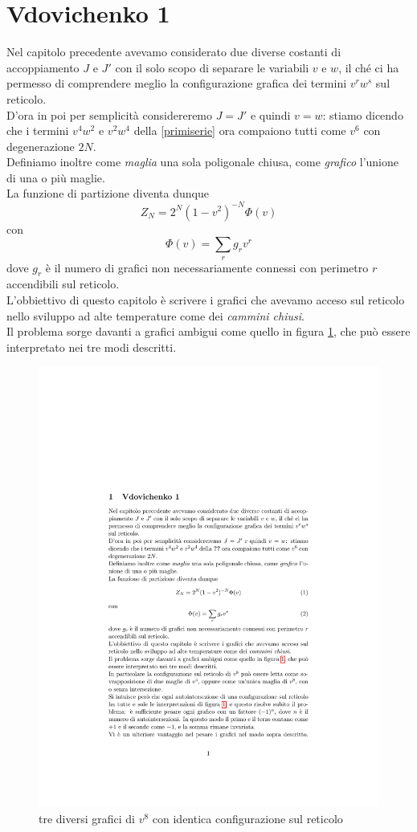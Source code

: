 \documentclass[11pt]{article}
\title{}
\author{}
\date{}
\begin{document}
\maketitle

\section{Vdovichenko 1}
\noindent
Nel capitolo precedente avevamo considerato due diverse costanti di accoppiamento $J$ e $J'$ con il solo scopo di separare le variabili $v$ e $w$, il ché ci ha permesso di comprendere meglio la configurazione grafica dei termini $v^rw^s$ sul reticolo.\\
D'ora in poi per semplicità considereremo $J=J'$ e quindi $v=w$: stiamo dicendo che i termini $v^4w^2$ e $v^2w^4$ della \ref{primiserie} ora compaiono tutti come $v^6$ con degenerazione $2N$. \\
Definiamo inoltre come \emph{maglia} una sola poligonale chiusa, come \emph{grafico} l'unione di una o più maglie.  \\
La funzione di partizione diventa dunque
\begin{equation}
Z_N=2^N(1-v^2)^{-N}\Phi(v)
\end{equation}
con 
\begin{equation}
\Phi(v)= \sum_r g_r v^r
\end{equation}
dove $g_r$ è il numero di grafici non necessariamente connessi con perimetro $r$ accendibili sul reticolo. \\
L'obbiettivo di questo capitolo è scrivere i grafici che avevamo acceso sul reticolo nello sviluppo ad alte temperature come dei \emph{cammini chiusi}. \\
Il problema sorge davanti a grafici ambigui come quello in figura \ref{v1}, che può essere interpretato nei tre modi descritti.
\begin{figure}[h]
\centering
\includegraphics[width=0.5\columnwidth]{v1}
\caption{tre diversi grafici di $v^8$ con identica configurazione sul reticolo}
\label{v1}
\end{figure}
\end{document}
